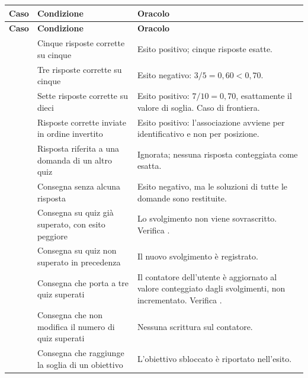 \begin{longtable}{@{}l L{5.0cm} L{7.4cm}@{}}
\toprule
\textbf{Caso} & \textbf{Condizione} & \textbf{Oracolo} \\
\midrule
\endfirsthead
\toprule
\textbf{Caso} & \textbf{Condizione} & \textbf{Oracolo} \\
\midrule
\endhead
\bottomrule
\endlastfoot

 & Cinque risposte corrette su cinque &
Esito positivo; cinque risposte esatte. \\

 & Tre risposte corrette su cinque &
Esito negativo: $3/5 = 0{,}60 < 0{,}70$. \\

 & Sette risposte corrette su dieci &
Esito positivo: $7/10 = 0{,}70$, esattamente il valore di soglia. Caso di
frontiera. \\

 & Risposte corrette inviate in ordine invertito &
Esito positivo: l'associazione avviene per identificativo e non per
posizione. \\

 & Risposta riferita a una domanda di un altro quiz &
Ignorata; nessuna risposta conteggiata come esatta. \\

 & Consegna senza alcuna risposta &
Esito negativo, ma le soluzioni di tutte le domande sono restituite. \\

 & Consegna su quiz già superato, con esito peggiore &
Lo svolgimento non viene sovrascritto. Verifica . \\

 & Consegna su quiz non superato in precedenza &
Il nuovo svolgimento è registrato. \\

 & Consegna che porta a tre quiz superati &
Il contatore dell'utente è aggiornato al valore conteggiato dagli
svolgimenti, non incrementato. Verifica . \\

 & Consegna che non modifica il numero di quiz superati &
Nessuna scrittura sul contatore. \\

 & Consegna che raggiunge la soglia di un obiettivo &
L'obiettivo sbloccato è riportato nell'esito. \\


\end{longtable}

